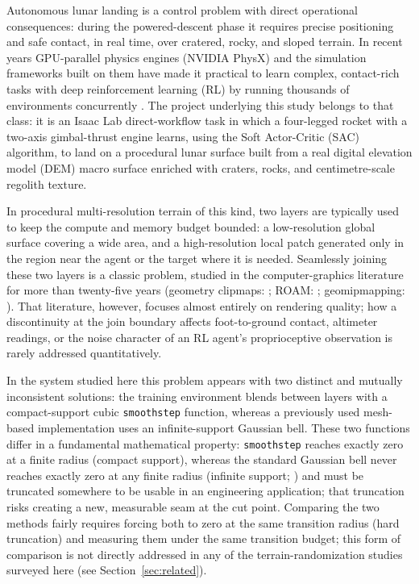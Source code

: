 Autonomous lunar landing is a control problem with direct operational consequences: during the powered-descent phase it requires precise positioning and safe contact, in real time, over cratered, rocky, and sloped terrain. In recent years GPU-parallel physics engines (NVIDIA PhysX) and the simulation frameworks built on them have made it practical to learn complex, contact-rich tasks with deep reinforcement learning (RL) by running thousands of environments concurrently \citep{mittal2023,nvidia2025,rudin2022}. The project underlying this study belongs to that class: it is an Isaac Lab direct-workflow task in which a four-legged rocket with a two-axis gimbal-thrust engine learns, using the Soft Actor-Critic (SAC) algorithm, to land on a procedural lunar surface built from a real digital elevation model (DEM) macro surface enriched with craters, rocks, and centimetre-scale regolith texture.

In procedural multi-resolution terrain of this kind, two layers are typically used to keep the compute and memory budget bounded: a low-resolution global surface covering a wide area, and a high-resolution local patch generated only in the region near the agent or the target where it is needed. Seamlessly joining these two layers is a classic problem, studied in the computer-graphics literature for more than twenty-five years (geometry clipmaps: \citealp{losasso2004}; ROAM: \citealp{duchaineau1997}; geomipmapping: \citealp{deboer2000}). That literature, however, focuses almost entirely on rendering quality; how a discontinuity at the join boundary affects foot-to-ground contact, altimeter readings, or the noise character of an RL agent's proprioceptive observation is rarely addressed quantitatively.

In the system studied here this problem appears with two distinct and mutually inconsistent solutions: the training environment blends between layers with a compact-support cubic \texttt{smoothstep} function, whereas a previously used mesh-based implementation uses an infinite-support Gaussian bell. These two functions differ in a fundamental mathematical property: \texttt{smoothstep} reaches exactly zero at a finite radius (compact support), whereas the standard Gaussian bell never reaches exactly zero at any finite radius (infinite support; \citealp{hardy1971}) and must be truncated somewhere to be usable in an engineering application; that truncation risks creating a new, measurable seam at the cut point. Comparing the two methods fairly requires forcing both to zero at the same transition radius (hard truncation) and measuring them under the same transition budget; this form of comparison is not directly addressed in any of the terrain-randomization studies surveyed here (see Section~\ref{sec:related}).

